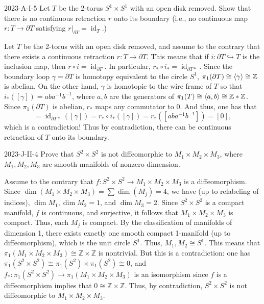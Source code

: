 \documentclass{article}
\begin{document}
	\begin{prb}{2023-A-I-5}
		Let $T$ be the 2-torus $S^{1} \times S^{1}$ with an open disk removed. Show that there is no continuous retraction $r$ onto its boundary (i.e., no continuous map $r: T \to \partial T$ satisfying $r|_{\partial T} = \operatorname{id}_{T}$.)
	\end{prb}
	Let $T$ be the 2-torus with an open disk removed, and assume to the contrary that there exists a continuous retraction $r: T \to \partial T$. This means that if $i: \partial T \hookrightarrow T$ is the inclusion map, then $r \circ i = \operatorname{id}_{\partial T}$. In particular, $r_{\ast} \circ i_{\ast} = \operatorname{id}_{\partial T \ast}$. Since the boundary loop $\gamma = \partial T$ is homotopy equivalent to the circle $S^{1}$, $\pi_{1}(\partial T) \cong \braket{\gamma} \cong \mathbb{Z}$ is abelian. On the other hand, $\gamma$ is homotopic to the wire frame of $T$ so that $i_{\ast}([\gamma]) = aba^{-1}b^{-1}$, where $a, b$ are the generators of $\pi_{1}(T) \cong \braket{a, b} \cong \mathbb{Z}\ast \mathbb{Z}$. Since $\pi_{1}(\partial T)$ is abelian, $r_{\ast}$ maps any commutator to $0$. And thus, one has that 
	\begin{equation*}
		[\gamma] = \operatorname{id}_{\partial T\ast}([\gamma]) = r_{\ast} \circ i_{\ast}([\gamma]) = r_{\ast}([aba^{-1}b^{-1}]) = [0], 
	\end{equation*}
	which is a contradiction! Thus by contradiction, there can be continuous retraction of $T$ onto its boundary. 
	
	\begin{prb}{2023-J-II-4}
		Prove that $S^{2} \times S^{2}$ is not diffeomorphic to $M_{1} \times M_{2} \times M_{3}$, where $M_{1}, M_{2}, M_{3}$ are smooth manifolds of nonzero dimension. 
	\end{prb}
	Assume to the contrary that $f: S^{2} \times S^{2} \to M_{1} \times M_{2}\times M_{3}$ is a diffeomorphism. Since $\dim(M_{1} \times M_{2} \times M_{3}) = \sum \dim(M_{j}) = 4$, we have (up to relabeling of indices), $\dim{M_{1}}, \dim{M_{2}} = 1$, and $\dim{M_{3}} = 2$. Since $S^{2} \times S^{2}$ is a compact manifold, $f$ is continuous, and surjective, it follows that $M_{1} \times M_{2} \times M_{3}$ is compact. Thus, each $M_{j}$ is compact. By the classification of manifolds of dimension 1, there exists exactly one smooth compact 1-manifold (up to diffeomorphism), which is the unit circle $S^{1}$. Thus, $M_{1}, M_{2} \cong S^{1}$. This means that $\pi_{1}(M_{1} \times M_{2} \times M_{3}) \cong \mathbb{Z} \times \mathbb{Z}$ is nontrivial. But this is a contradiction: one has $\pi_{1}(S^{2} \times S^{2}) \cong \pi_{1}(S^{2}) \times \pi_{1}(S^{2}) \cong 0$, and $f_{\ast}: \pi_{1}(S^{2} \times S^{2}) \to \pi_{1}(M_{1} \times M_{2} \times M_{3})$ is an isomorphism since $f$ is a diffeomorphism implies that $0 \cong \mathbb{Z} \times \mathbb{Z}$. Thus, by contradiction, $S^{2} \times S^{2}$ is not diffeomorphic to $M_{1} \times M_{2} \times M_{3}$.  
	
\end{document}
